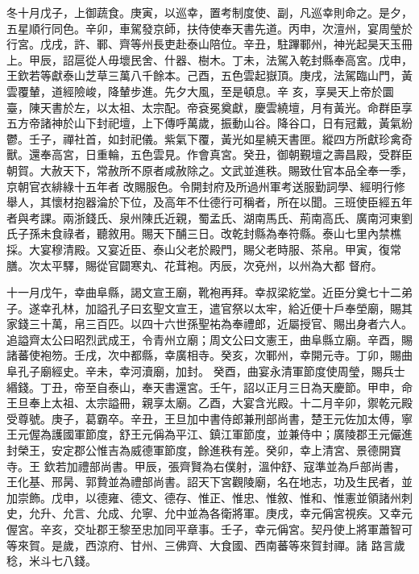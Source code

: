 \begin{pinyinscope}
 冬十月戊子，上御蔬食。庚寅，以巡幸，置考制度使、副，凡巡幸則命之。是夕，五星順行同色。辛卯，車駕發京師，扶侍使奉天書先道。丙申，次澶州，宴周瑩於行宮。戊戌，許、鄆、齊等州長吏赴泰山陪位。辛丑，駐蹕鄆州，神光起昊天玉冊上。甲辰，詔扈從人毋壞民舍、什器、樹木。丁未，法駕入乾封縣奉高宮。戊申，王欽若等獻泰山芝草三萬八千餘本。己酉，五色雲起嶽頂。庚戌，法駕臨山門，黃雲覆輦，道經險峻，降輦步進。先夕大風，至是頓息。辛
 亥，享昊天上帝於圜臺，陳天書於左，以太祖、太宗配。帝袞冕奠獻，慶雲繞壇，月有黃光。命群臣享五方帝諸神於山下封祀壇，上下傳呼萬歲，振動山谷。降谷口，日有冠戴，黃氣紛鬱。壬子，禪社首，如封祀儀。紫氣下覆，黃光如星繞天書匣。縱四方所獻珍禽奇獸。還奉高宮，日重輪，五色雲見。作會真宮。癸丑，御朝覲壇之壽昌殿，受群臣朝賀。大赦天下，常赦所不原者咸赦除之。文武並進秩。賜致仕官本品全奉一季，京朝官衣緋綠十五年者
 改賜服色。令開封府及所過州軍考送服勤詞學、經明行修舉人，其懷材抱器淪於下位，及高年不仕德行可稱者，所在以聞。三班使臣經五年者與考課。兩浙錢氏、泉州陳氏近親，蜀孟氏、湖南馬氏、荊南高氏、廣南河東劉氏子孫未食祿者，聽敘用。賜天下酺三日。改乾封縣為奉符縣。泰山七里內禁樵採。大宴穆清殿。又宴近臣、泰山父老於殿門，賜父老時服、茶帛。甲寅，復常膳。次太平驛，賜從官闢寒丸、花茸袍。丙辰，次兗州，以州為大都
 督府。



 十一月戊午，幸曲阜縣，謁文宣王廟，靴袍再拜。幸叔梁紇堂。近臣分奠七十二弟子。遂幸孔林，加謚孔子曰玄聖文宣王，遣官祭以太牢，給近便十戶奉塋廟，賜其家錢三十萬，帛三百匹。以四十六世孫聖祐為奉禮郎，近屬授官、賜出身者六人。追謚齊太公曰昭烈武成王，令青州立廟；周文公曰文憲王，曲阜縣立廟。辛酉，賜諸蕃使袍笏。壬戌，次中都縣，幸廣相寺。癸亥，次鄆州，幸開元寺。丁卯，賜曲阜孔子廟經史。辛未，幸河瀆廟，加封。
 癸酉，曲宴永清軍節度使周瑩，賜兵士緡錢。丁丑，帝至自泰山，奉天書還宮。壬午，詔以正月三日為天慶節。甲申，命王旦奉上太祖、太宗謚冊，親享太廟。乙酉，大宴含光殿。十二月辛卯，禦乾元殿受尊號。庚子，葛霸卒。辛丑，王旦加中書侍郎兼刑部尚書，楚王元佐加太傅，寧王元偓為護國軍節度，舒王元偁為平江、鎮江軍節度，並兼侍中；廣陵郡王元儼進封榮王，安定郡公惟吉為威德軍節度，餘進秩有差。癸卯，幸上清宮、景德開寶寺。王
 欽若加禮部尚書。甲辰，張齊賢為右僕射，溫仲舒、寇準並為戶部尚書，王化基、邢昺、郭贄並為禮部尚書。詔天下宮觀陵廟，名在地志，功及生民者，並加崇飾。戊申，以德雍、德文、德存、惟正、惟忠、惟敘、惟和、惟憲並領諸州刺史，允升、允言、允成、允寧、允中並為各衛將軍。庚戌，幸元偁宮視疾。又幸元偓宮。辛亥，交址郡王黎至忠加同平章事。壬子，幸元偁宮。契丹使上將軍蕭智可等來賀。是歲，西涼府、甘州、三佛齊、大食國、西南蕃等來賀封禪。諸
 路言歲稔，米斗七八錢。




\end{pinyinscope}
